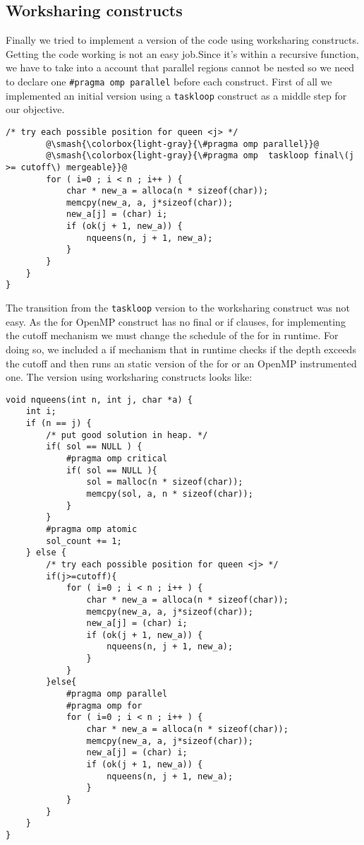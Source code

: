 \subsection{Worksharing constructs}
\justify
Finally we tried to implement a version of the code using worksharing constructs. 
Getting the code working is not an easy job.Since it's within a recursive function, we have to take into a account that parallel regions cannot be nested so we need to declare one \texttt{\#pragma omp parallel} before each construct.
\justify
First of all we implemented an initial version using a \texttt{taskloop} construct as a middle step for our objective.
\begin{lstlisting}[escapechar=@]
		/* try each possible position for queen <j> */
		@\smash{\colorbox{light-gray}{\#pragma omp parallel}}@
		@\smash{\colorbox{light-gray}{\#pragma omp  taskloop final\(j >= cutoff\) mergeable}}@
		for ( i=0 ; i < n ; i++ ) {
			char * new_a = alloca(n * sizeof(char));
			memcpy(new_a, a, j*sizeof(char));
			new_a[j] = (char) i;
			if (ok(j + 1, new_a)) {
				nqueens(n, j + 1, new_a);
			}
		}
	}
}
\end{lstlisting}
\justify
The transition from the \texttt{taskloop} version to the worksharing construct was not easy. 
\justify
As the for OpenMP construct has no final or if clauses, for implementing the cutoff mechanism we must change the schedule of the for in runtime. For doing so, we included a if mechanism that in runtime checks if the depth exceeds the cutoff and then runs an static version of the for or an OpenMP instrumented one. 
\justify
The version using worksharing constructs looks like:
\begin{lstlisting}
void nqueens(int n, int j, char *a) {
	int i;
	if (n == j) {
		/* put good solution in heap. */
		if( sol == NULL ) {
			#pragma omp critical
			if( sol == NULL ){
				sol = malloc(n * sizeof(char));
				memcpy(sol, a, n * sizeof(char));
			}
		}
		#pragma omp atomic
		sol_count += 1;
	} else {
		/* try each possible position for queen <j> */
        if(j>=cutoff){
            for ( i=0 ; i < n ; i++ ) {
                char * new_a = alloca(n * sizeof(char));
                memcpy(new_a, a, j*sizeof(char));
                new_a[j] = (char) i;
                if (ok(j + 1, new_a)) {
                    nqueens(n, j + 1, new_a);
                }
            }
        }else{
            #pragma omp parallel
            #pragma omp for 
            for ( i=0 ; i < n ; i++ ) {
                char * new_a = alloca(n * sizeof(char));
                memcpy(new_a, a, j*sizeof(char));
                new_a[j] = (char) i;
                if (ok(j + 1, new_a)) {
                    nqueens(n, j + 1, new_a);
                }
            }
        }
    }
}
\end{lstlisting}
